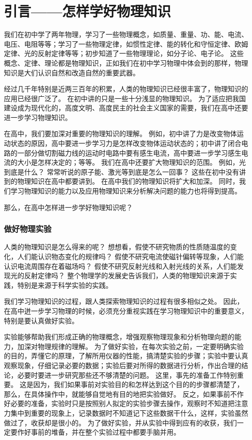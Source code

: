 \chapter{引言——怎样学好物理知识}

我们在初中学了两年物理，学习了一些物理概念，如质量、重量、功、能、电流、电压、电阻等等；学习了一些物理定律，如惯性定律、能的转化和守恒定律、欧姆定律、光的反射定律等等；初步知道了一些物理理论，如分子论、电子论。
这些概念、定律、理论都是物理知识，正如我们在初中学习物理中体会到的那样，物理知识是大们认识自然和改造自然的重要武器。

经过几千年特别是近两三百年的积累，人类的物理知识已经很丰富了，物理知识的应用已经很广泛了。
在初中讲的只是一些十分浅显的物理知识。
为了适应把我国建设成为现代化的，高度文明、高度民主的社会主义国家的需要，我们在高中还要进一步学习物理知识。

在高中，我们要加深对重要的物理知识的理解。
例如，初中讲了力是改变物体运动状态的原因，高中要进一步学习力是怎样改变物体运动状态的；初中讲了闭合电路的一部分做切割磁力线的运动时电路中要有感生电流，高中要进一步学习感生电流的大小是怎样决定的；等等。
我们在高中还要扩大物理知识的范围。
例如，光到底是什么？
常常听说的原子能、激光等到底是怎么一回事？
这些在初中没有讲到的物理知识在高中都要讲到。
在高中我们的物理知识将扩大和加深。
同时，我们学习物理知识的能力以及应用物理知识来分析解决问题的能力也将得到提高。

那么，在高中怎样进一步学好物理知识呢？

\subsection*{做好物理实验}
人类的物理知识是怎么得来的呢？
想想看，假使不研究物质的性质随温度的变化，人们能认识物态变化的规律吗？
假使不研究电流使磁针偏转等现象，人们能认识电流周围存在着磁场吗？
假使不研究反射光线和入射光线的关系，人们能发现光的反射定律吗？
整个物理学的发展史告诉我们，人类的物理知识来源于实践，特别是来源于科学实验的实践。

我们学习物理知识的过程，跟人类探索物理知识的过程有很多相似之处。
因此，在高中迸一步学习物理的时候，必须充分重视实践在学习物理知识中的重要意义，特别是要认真做好实验。

实验能够帮助我们形成正确的物理概念，增强观察物理现象和分析物理向题的能力，加深对物理规律的理解。
为了做好实验，在每次实验之前，一定要明确实验的目的，弄懂它的原理，了解所用仪器的性能，搞清楚实验的步骤；实验中要认真观察现象，仔细记录必要的数据；实验后要对所得的数据进行分析，作出合理的结论，必要时要进一步研究那些还不够清楚的问题。
这里，事先的准备工作特别重要。
这是因为，我们如果事前对实验目的和怎样达到这个目的的步骤都清楚了，那么，在具体操作中，就能够自觉地有目的地把实验做好。
反之，如果事前不作好必要的准备，实验时只是按照别人拟定的实验步骤去操作，观察时不知道把注意力集中到重要的现象上，记录数据时不知道记下这些数据干什么，这样，实验虽然做过了，收获却是很小的。
为了做好实验，并从实验中得到应有的收获，我们一定要作好事前的堆备，并在整个实验过程中都要手脑并用。

